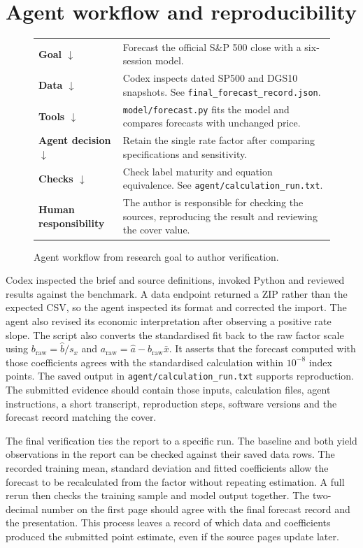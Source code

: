 \documentclass[11pt,a4paper]{article}
\begin{document}
\section{Agent workflow and reproducibility}
\begin{figure}[htbp]
\centering
\begin{tabularx}{0.95\linewidth}{@{}>{\bfseries}lX@{}}
Goal $\downarrow$ & Forecast the official S\&P 500 close with a six-session model.\\
Data $\downarrow$ & Codex inspects dated SP500 and DGS10 snapshots. See \texttt{final\_forecast\_record.json}.\\
Tools $\downarrow$ & \texttt{model/forecast.py} fits the model and compares forecasts with unchanged price.\\
Agent decision $\downarrow$ & Retain the single rate factor after comparing specifications and sensitivity.\\
Checks $\downarrow$ & Check label maturity and equation equivalence. See \texttt{agent/calculation\_run.txt}.\\
Human responsibility & The author is responsible for checking the sources, reproducing the result and reviewing the cover value.\\
\end{tabularx}
\caption{Agent workflow from research goal to author verification.}
\end{figure}

Codex inspected the brief and source definitions, invoked Python and reviewed results against the benchmark. A data endpoint returned a ZIP rather than the expected CSV, so the agent inspected its format and corrected the import. The agent also revised its economic interpretation after observing a positive rate slope. The script also converts the standardised fit back to the raw factor scale using $b_{\mathrm{raw}}=\hat b/s_x$ and $a_{\mathrm{raw}}=\hat a-b_{\mathrm{raw}}\bar{x}$. It asserts that the forecast computed with those coefficients agrees with the standardised calculation within $10^{-8}$ index points. The saved output in \texttt{agent/calculation\_run.txt} supports reproduction. The submitted evidence should contain those inputs, calculation files, agent instructions, a short transcript, reproduction steps, software versions and the forecast record matching the cover.

The final verification ties the report to a specific run. The baseline and both yield observations in the report can be checked against their saved data rows. The recorded training mean, standard deviation and fitted coefficients allow the forecast to be recalculated from the factor without repeating estimation. A full rerun then checks the training sample and model output together. The two-decimal number on the first page should agree with the final forecast record and the presentation. This process leaves a record of which data and coefficients produced the submitted point estimate, even if the source pages update later.
\end{document}
